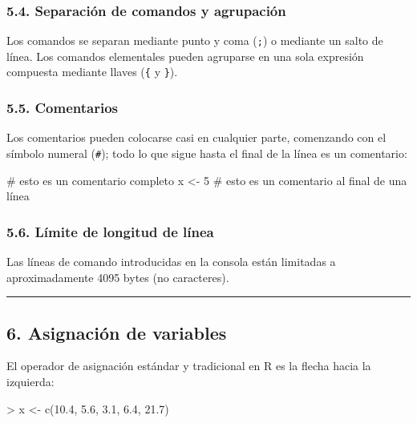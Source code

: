 \documentclass[
  jou,
  floatsintext,
  longtable,
  a4paper,
  nolmodern,
  notxfonts,
  notimes,
  12pt,
  colorlinks=true,linkcolor=blue,citecolor=blue,urlcolor=blue]{apa7}
\newenvironment{Shaded}{\begin{snugshade}}{\end{snugshade}}
\newcommand{\CommentTok}[1]{\textcolor[rgb]{0.37,0.37,0.37}{#1}}
\newcommand{\DecValTok}[1]{\textcolor[rgb]{0.68,0.00,0.00}{#1}}
\newcommand{\FloatTok}[1]{\textcolor[rgb]{0.68,0.00,0.00}{#1}}
\newcommand{\FunctionTok}[1]{\textcolor[rgb]{0.28,0.35,0.67}{#1}}
\newcommand{\NormalTok}[1]{\textcolor[rgb]{0.00,0.23,0.31}{#1}}
\newcommand{\OtherTok}[1]{\textcolor[rgb]{0.00,0.23,0.31}{#1}}
\newcommand{\SpecialCharTok}[1]{\textcolor[rgb]{0.37,0.37,0.37}{#1}}
\begin{document}
\subsubsection{5.4. Separación de comandos y
agrupación}\label{separaciuxf3n-de-comandos-y-agrupaciuxf3n}

Los comandos se separan mediante punto y coma (\texttt{;}) o mediante un
salto de línea. Los comandos elementales pueden agruparse en una sola
expresión compuesta mediante llaves (\texttt{\{} y \texttt{\}}).

\subsubsection{5.5. Comentarios}\label{comentarios}

Los comentarios pueden colocarse casi en cualquier parte, comenzando con
el símbolo numeral (\texttt{\#}); todo lo que sigue hasta el final de la
línea es un comentario:

\begin{Shaded}
\begin{Highlighting}[]
\CommentTok{\# esto es un comentario completo}
\NormalTok{x }\OtherTok{\textless{}{-}} \DecValTok{5}  \CommentTok{\# esto es un comentario al final de una línea}
\end{Highlighting}
\end{Shaded}

\subsubsection{5.6. Límite de longitud de
línea}\label{luxedmite-de-longitud-de-luxednea}

Las líneas de comando introducidas en la consola están limitadas a
aproximadamente 4095 bytes (no caracteres).

\begin{center}\rule{0.5\linewidth}{0.5pt}\end{center}

\subsection{6. Asignación de
variables}\label{asignaciuxf3n-de-variables}

El operador de asignación estándar y tradicional en R es la flecha hacia
la izquierda:

\begin{Shaded}
\begin{Highlighting}[]
\SpecialCharTok{\textgreater{}}\NormalTok{ x }\OtherTok{\textless{}{-}} \FunctionTok{c}\NormalTok{(}\FloatTok{10.4}\NormalTok{, }\FloatTok{5.6}\NormalTok{, }\FloatTok{3.1}\NormalTok{, }\FloatTok{6.4}\NormalTok{, }\FloatTok{21.7}\NormalTok{)}
\end{Highlighting}
\end{Shaded}
\end{document}
